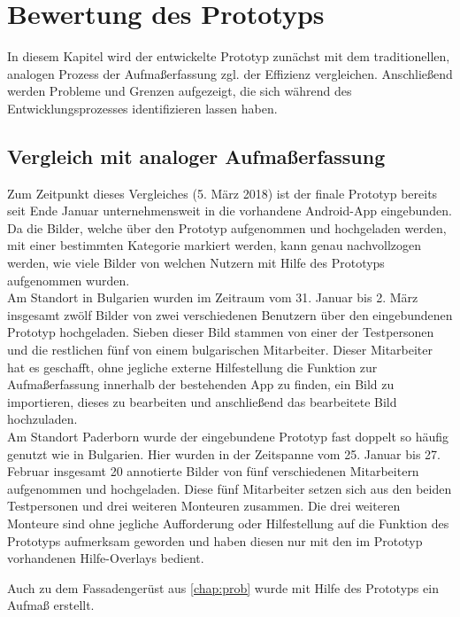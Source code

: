 \chapter{Bewertung des Prototyps}
In diesem Kapitel wird der entwickelte Prototyp zunächst mit dem traditionellen, analogen Prozess der Aufmaßerfassung zgl. der Effizienz vergleichen.
Anschließend werden Probleme und Grenzen aufgezeigt, die sich während des Entwicklungsprozesses identifizieren lassen haben.

\section{Vergleich mit analoger Aufmaßerfassung}
Zum Zeitpunkt dieses Vergleiches (5. März 2018) ist der finale Prototyp bereits seit Ende Januar unternehmensweit in die vorhandene Android-App eingebunden.
Da die Bilder, welche über den Prototyp aufgenommen und hochgeladen werden, mit einer bestimmten Kategorie markiert werden, kann genau nachvollzogen werden, wie viele Bilder von welchen Nutzern mit Hilfe des Prototyps aufgenommen wurden. \\

Am Standort in Bulgarien wurden im Zeitraum vom 31. Januar bis 2. März insgesamt zwölf Bilder von zwei verschiedenen Benutzern über den eingebundenen Prototyp hochgeladen.
Sieben dieser Bild stammen von einer der Testpersonen und die restlichen fünf von einem bulgarischen Mitarbeiter.
Dieser Mitarbeiter hat es geschafft, ohne jegliche externe Hilfestellung die Funktion zur Aufmaßerfassung innerhalb der bestehenden App zu finden, ein Bild zu importieren, dieses zu bearbeiten und anschließend das bearbeitete Bild hochzuladen. 
 \\

Am Standort Paderborn wurde der eingebundene Prototyp fast doppelt so häufig genutzt wie in Bulgarien.
Hier wurden in der Zeitspanne vom 25. Januar bis 27. Februar insgesamt 20 annotierte Bilder von fünf verschiedenen Mitarbeitern aufgenommen und hochgeladen.
Diese fünf Mitarbeiter setzen sich aus den beiden Testpersonen und drei weiteren Monteuren zusammen.
Die drei weiteren Monteure sind ohne jegliche Aufforderung oder Hilfestellung auf die Funktion des Prototyps aufmerksam geworden und haben diesen nur mit den im Prototyp vorhandenen Hilfe-Overlays bedient.

Auch zu dem Fassadengerüst aus \autoref{chap:prob} wurde mit Hilfe des Prototyps ein Aufmaß erstellt.

